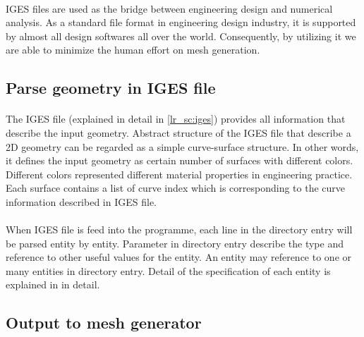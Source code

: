 \paragraph{}
IGES\cite{IGES1983} files are used as the bridge between engineering design and numerical analysis.
As a standard file format in engineering design industry, it is supported by almost all design softwares all over the world.
Consequently, by utilizing it we are able to minimize the human effort on mesh generation.

\subsection{Parse geometry in IGES file}
\paragraph{}
The IGES file (explained in detail in \ref{lr_sc:iges}) provides all information that describe the input geometry.
Abstract structure of the IGES file that describe a 2D geometry can be regarded as a simple curve-surface structure.
In other words, it defines the input geometry as certain number of surfaces with different colors.
Different colors represented different material properties in engineering practice.
Each surface contains a list of curve index which is corresponding to the curve information described in IGES file.

\paragraph{}
When IGES file is feed into the programme, each line in the directory entry will be parsed entity by entity.
Parameter in directory entry describe the type and reference to other useful values for the entity.
An entity may reference to one or many entities in directory entry.
Detail of the specification of each entity is explained in \cite{Nasr2007} in detail.

\subsection{Output to mesh generator}
\label{qdt_section:iges_output}
